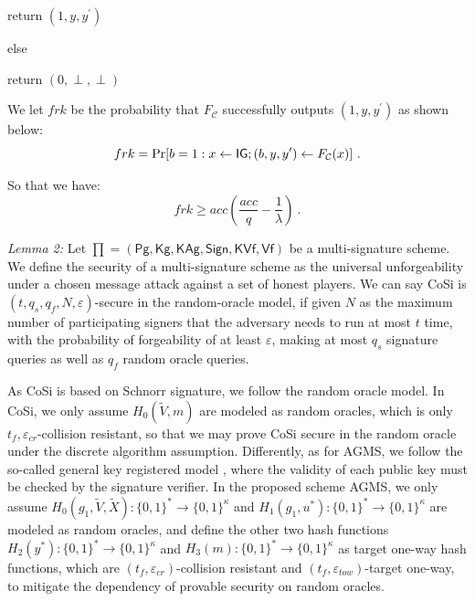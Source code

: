 \documentclass[journal]{IEEEtran}
\begin{document}
\qquad return \((1,y,y^\prime)\)

else

\qquad return \((0,\perp,\perp)\)

We let \(frk\) be the probability that \(F_\mathcal{C}\) successfully outputs \((1,y,y^\prime)\) as shown below:
\begin{equation}
frk=\textup{Pr}[b=1:x\leftarrow \textsf{IG};(b,y,y^\prime)\leftarrow F_
\mathcal{C}
(x)] \ .
\end{equation}

 So that we have:
\begin{equation}
frk\geq acc(\frac{acc}{q} - \frac{1}{\lambda}) \ .
\end{equation}

\noindent\emph{Lemma 2:} Let \(\prod =(\textsf{Pg},\textsf{Kg},\textsf{KAg},\textsf{Sign},\textsf{KVf},\textsf{Vf})\) be a multi-signature scheme. We define the security of a multi-signature scheme as the universal unforgeability under a chosen message attack against a set of honest players. We can say CoSi is \((t,q_s,q_f,N,\varepsilon)\)-secure in the random-oracle model, if given \(N\) as the maximum number of participating signers that the adversary needs to run at most \(t\) time, with the probability of forgeability of at least \(\varepsilon\), making at most \(q_s\) signature queries as well as \(q_f\) random oracle queries.

As CoSi is based on Schnorr signature, we follow the random oracle model. In CoSi, we only assume \(H_0(\tilde{V},m)\) are modeled as random oracles, which is only \(t_f,\varepsilon_{cr}\)-collision resistant, so that we may prove CoSi secure in the random oracle under the discrete algorithm assumption. Differently, as for AGMS, we follow the so-called general key registered model \cite{24DBLP:conf/scn/BagherzandiJ08}, where the validity of each public key must be checked by the signature verifier.
In the proposed scheme AGMS, we only assume
\(H_0(g_1,\tilde{V},\tilde{X}):{\{0,1\}}^{\ast}\rightarrow {\{0,1\}}^{\kappa}\) and \(H_1(g_1,u^\ast):{\{0,1\}}^{\ast}\rightarrow {\{0,1\}}^{\kappa}\) are modeled as random oracles, and define the other two hash functions \(H_2(y^\ast):{\{0,1\}}^{\ast}\rightarrow {\{0,1\} }^{\kappa}\) and \(H_3(m):{\{0,1\}}^{\ast}\rightarrow {\{0,1\}}^{\kappa}\) as target one-way hash functions, which are \((t_f,\varepsilon_{cr})\)-collision resistant and \((t_f,\varepsilon_{tow})\)-target one-way, to mitigate the dependency of provable security on random oracles.
\end{document}
